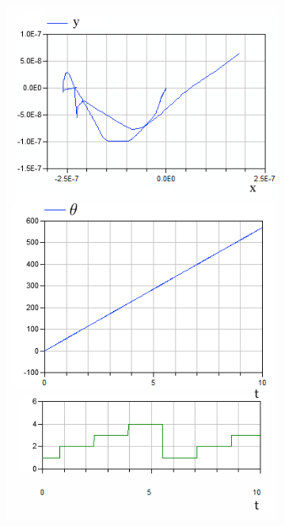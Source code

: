 \vspace{50pt}

\newpage

\begin{figure}[ht]
    \centering
    \begin{subfigure}{.47\textwidth}
        \centering
        \includegraphics[width=\textwidth]{content/pic/new/dry/example_v_0_0_omega_1_frac_1e-1_n_4_time_10s.png}

\end{subfigure}
\end{figure}

